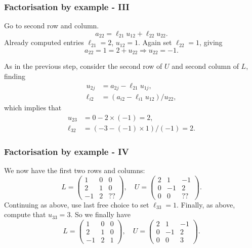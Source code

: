 \documentclass{beamer}
\begin{document}
\begin{frame}
  \frametitle{Factorisation by example - III}

  Go to second row and column.
  \begin{equation*}
    a_{2 2} = \ell_{2 1} u_{1 2} + \ell_{2 2} u_{2 2}.
  \end{equation*}
  Already computed entries $\ell_{2 1} = 2$, $u_{1 2} = 1$. Again set
  $\ell_{2 2} = 1$, giving
  \begin{equation*}
    a_{2 2} = 1 = 2 + u_{2 2} \Rightarrow u_{2 2} = -1.
  \end{equation*} \pause

  As in the previous step, consider the second row of $U$ and
  second column of $L$, finding
  \begin{align*}
    u_{2 j}    & = a_{2 j} - \ell_{2 1} u_{1 j}, \\
    \ell_{i 2} & = \left(a_{i 2} - \ell_{i 1} u_{1 2} \right) / u_{2 2},
  \end{align*}
  which implies that
  \begin{align*}
    u_{2 3}    & = 0 - 2 \times (-1) = 2, \\
    \ell_{3 2} & = \left(-3 - (-1) \times 1\right) / (-1) = 2.
  \end{align*}

\end{frame}

\begin{frame}
  \frametitle{Factorisation by example - IV}

  We now have the first two rows and columns:
  \begin{equation*}
    L =
    \begin{pmatrix}
      1 & 0 & 0 \\
      2 & 1 & 0 \\
      -1 & 2 & ??
    \end{pmatrix}, \quad
    U =
    \begin{pmatrix}
      2 & 1 & -1 \\
      0 & -1 & 2 \\
      0 & 0 & ??
    \end{pmatrix}.
  \end{equation*} \pause
  Continuing as above, use last free choice to set $\ell_{3 3} =
  1$. Finally, as above, compute that $u_{3 3} = 3$. So we finally
  have
  \begin{equation*}
    L =
    \begin{pmatrix}
      1 & 0 & 0 \\
      2 & 1 & 0 \\
      -1 & 2 & 1
    \end{pmatrix}, \quad
    U =
    \begin{pmatrix}
      2 & 1 & -1 \\
      0 & -1 & 2 \\
      0 & 0 & 3
    \end{pmatrix}.
  \end{equation*}

\end{frame}
\end{document}
